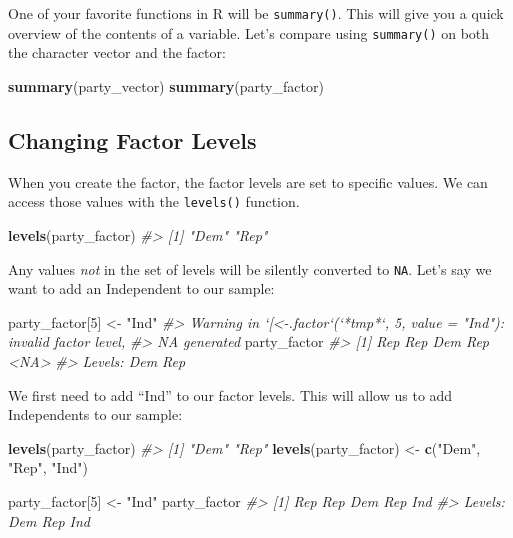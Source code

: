 \documentclass[]{book}
\newenvironment{Shaded}{\begin{snugshade}}{\end{snugshade}}
\newcommand{\KeywordTok}[1]{\textcolor[rgb]{0.13,0.29,0.53}{\textbf{#1}}}
\newcommand{\DecValTok}[1]{\textcolor[rgb]{0.00,0.00,0.81}{#1}}
\newcommand{\StringTok}[1]{\textcolor[rgb]{0.31,0.60,0.02}{#1}}
\newcommand{\CommentTok}[1]{\textcolor[rgb]{0.56,0.35,0.01}{\textit{#1}}}
\newcommand{\NormalTok}[1]{#1}
\begin{document}
One of your favorite functions in R will be \texttt{summary()}. This
will give you a quick overview of the contents of a variable. Let's
compare using \texttt{summary()} on both the character vector and the
factor:

\begin{Shaded}
\begin{Highlighting}[]
\KeywordTok{summary}\NormalTok{(party_vector)}
\KeywordTok{summary}\NormalTok{(party_factor)}
\end{Highlighting}
\end{Shaded}

\subsection{Changing Factor Levels}\label{changing-factor-levels}

When you create the factor, the factor levels are set to specific
values. We can access those values with the \texttt{levels()} function.

\begin{Shaded}
\begin{Highlighting}[]
\KeywordTok{levels}\NormalTok{(party_factor)}
\CommentTok{#> [1] "Dem" "Rep"}
\end{Highlighting}
\end{Shaded}

Any values \emph{not} in the set of levels will be silently converted to
\texttt{NA}. Let's say we want to add an Independent to our sample:

\begin{Shaded}
\begin{Highlighting}[]
\NormalTok{party_factor[}\DecValTok{5}\NormalTok{] <-}\StringTok{ "Ind"}
\CommentTok{#> Warning in `[<-.factor`(`*tmp*`, 5, value = "Ind"): invalid factor level,}
\CommentTok{#> NA generated}
\NormalTok{party_factor}
\CommentTok{#> [1] Rep  Rep  Dem  Rep  <NA>}
\CommentTok{#> Levels: Dem Rep}
\end{Highlighting}
\end{Shaded}

We first need to add ``Ind'' to our factor levels. This will allow us to
add Independents to our sample:

\begin{Shaded}
\begin{Highlighting}[]
\KeywordTok{levels}\NormalTok{(party_factor)}
\CommentTok{#> [1] "Dem" "Rep"}
\KeywordTok{levels}\NormalTok{(party_factor) <-}\StringTok{ }\KeywordTok{c}\NormalTok{(}\StringTok{"Dem"}\NormalTok{, }\StringTok{"Rep"}\NormalTok{, }\StringTok{"Ind"}\NormalTok{)}

\NormalTok{party_factor[}\DecValTok{5}\NormalTok{] <-}\StringTok{ "Ind"}
\NormalTok{party_factor}
\CommentTok{#> [1] Rep Rep Dem Rep Ind}
\CommentTok{#> Levels: Dem Rep Ind}
\end{Highlighting}
\end{Shaded}
\end{document}
